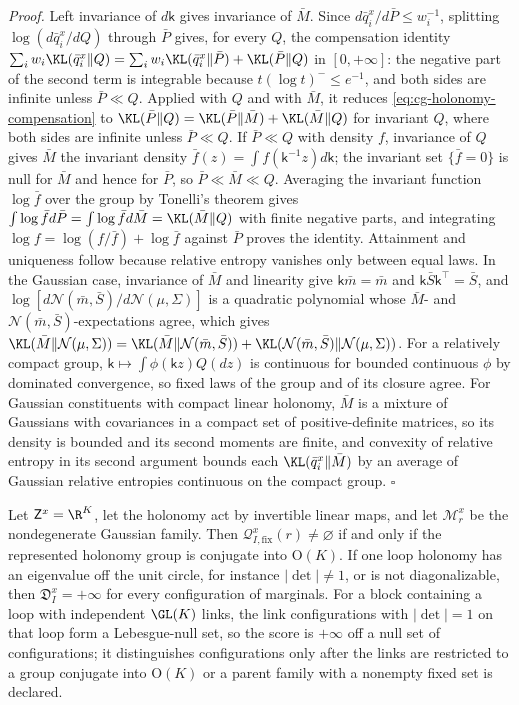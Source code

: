 \noindent\emph{Proof.}
Left invariance of $d\mathsf k$ gives invariance of $\bar M$. Since $d\bar q^x_i/d\bar P\leq w_i^{-1}$,
splitting $\log(d\bar q^x_i/dQ)$ through $\bar P$ gives, for every $Q$, the compensation identity
$\sum_iw_i\KL(\bar q^x_i\Vert Q)=\sum_iw_i\KL(\bar q^x_i\Vert\bar P)+\KL(\bar P\Vert Q)$ in $[0,+\infty]$: the
negative part of the second term is integrable because $t(\log t)^-\leq e^{-1}$, and both sides are
infinite unless $\bar P\ll Q$. Applied with $Q$ and with $\bar M$, it reduces
\eqref{eq:cg-holonomy-compensation} to $\KL(\bar P\Vert Q)=\KL(\bar P\Vert\bar M)+\KL(\bar M\Vert Q)$ for
invariant $Q$, where both sides are infinite unless $\bar P\ll Q$. If $\bar P\ll Q$ with density $f$,
invariance of $Q$ gives $\bar M$ the invariant density $\bar f(z)=\int f(\mathsf k^{-1}z)d\mathsf k$; the
invariant set $\{\bar f=0\}$ is null for $\bar M$ and hence for $\bar P$, so $\bar P\ll\bar M\ll Q$. Averaging
the invariant function $\log\bar f$ over the group by Tonelli's theorem gives
$\int\log\bar fd\bar P=\int\log\bar fd\bar M=\KL(\bar M\Vert Q)$ with finite negative parts, and integrating
$\log f=\log(f/\bar f)+\log\bar f$ against $\bar P$ proves the identity. Attainment and uniqueness follow
because relative entropy vanishes only between equal laws. In the Gaussian case, invariance of $\bar M$ and
linearity give $\mathsf k\bar m=\bar m$ and $\mathsf k\bar S\mathsf k^\top=\bar S$, and
$\log[d\mathcal N(\bar m,\bar S)/d\mathcal N(\mu,\Sigma)]$ is a quadratic polynomial whose $\bar M$- and
$\mathcal N(\bar m,\bar S)$-expectations agree, which gives
$\KL(\bar M\Vert\mathcal N(\mu,\Sigma))=\KL(\bar M\Vert\mathcal N(\bar m,\bar S))+\KL(\mathcal N(\bar m,\bar S)\Vert\mathcal N(\mu,\Sigma))$.
For a relatively compact group, $\mathsf k\mapsto\int\phi(\mathsf kz)Q(dz)$ is continuous for bounded
continuous $\phi$ by dominated convergence, so fixed laws of the group and of its closure agree. For
Gaussian constituents with compact linear holonomy, $\bar M$ is a mixture of Gaussians with covariances in
a compact set of positive-definite matrices, so its density is bounded and its second moments are finite,
and convexity of relative entropy in its second argument bounds each $\KL(\bar q^x_i\Vert\bar M)$ by an
average of Gaussian relative entropies continuous on the compact group. $\square$

Let $\mathsf Z^x=\R^K$, let the holonomy act by invertible linear maps, and let $\mathscr M^x_r$ be the
nondegenerate Gaussian family. Then $\mathscr Q^x_{I,\mathrm{fix}}(r)\neq\varnothing$ if and only if the
represented holonomy group is conjugate into $\mathrm O(K)$. If one loop holonomy has an eigenvalue off the
unit circle, for instance $\lvert\det\rvert\neq1$, or is not diagonalizable, then $\mathfrak D^x_I=+\infty$
for every configuration of marginals. For a block containing a loop with independent $\GL(K)$ links, the
link configurations with $\lvert\det\rvert=1$ on that loop form a Lebesgue-null set, so the score is
$+\infty$ off a null set of configurations; it distinguishes configurations only after the links are
restricted to a group conjugate into $\mathrm O(K)$ or a parent family with a nonempty fixed set is
declared. 

